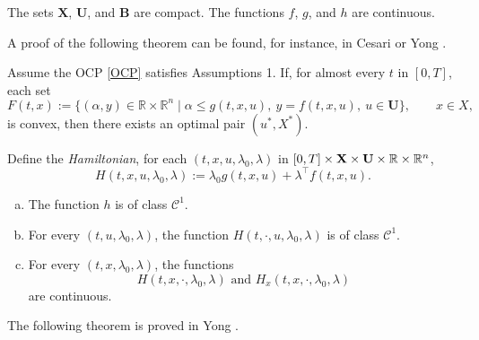 \begin{assumption}\label{FilippovAssump}\rm The sets $\mathbf{X}$,  $\mathbf{U}$, and $\mathbf{B}$ are compact. The functions $f$, $g$, and $h$ are continuous.
\end{assumption}
A proof of the following theorem can be found, for instance, in Cesari \cite[Sect. 9.3.]{Cesari83} or Yong \cite[Theorem 2.2.1]{Yong2015}. 
\begin{theorem}[Filippov]\label{FilipovThm} Assume the OCP \eqref{OCP} satisfies Assumptions 1. If, for almost every $t$ in $[0,T]$, each set
        \begin{equation}\label{convexF(t,x)}
F(t,x):= \{ (\alpha, y)\in \mathbb{R}\times \mathbb{R}^n\mid  
    \alpha \leq g(t,x,u), \  y=f(t,x,u), \ u\in \mathbf{U}\},\qquad x\in X,
        \end{equation}
is convex, then there exists an optimal pair $(u^\ast,X^\ast)$.
\end{theorem} 

Define the {\it Hamiltonian}, for each  $(t,x,u,\lambda_0,\lambda)$ in 
$[0,T]\times \mathbf{X}\times \mathbf{U}\times\mathbb{R}\times\mathbb{R}^n$,
    \[H(t,x,u,\lambda_0,\lambda):= \lambda_0g(t,x,u) + \lambda^\top f(t,x,u).  
    \]  
    

\begin{assumption}\label{MPassump}\rm  
\begin{enumerate}[(a)]
    \item The function $h$ is of class $\mathcal{C}^1$.
    \item For every $(t,u,\lambda_0,\lambda)$, the function $H(t,\cdot,u,\lambda_0,\lambda)$ is of class $\mathcal{C}^1$.
    \item For every $(t,x,\lambda_0,\lambda)$, the functions
     \[ H(t,x,\cdot,\lambda_0,\lambda) \mbox{ and }   H_x(t,x,\cdot,\lambda_0,\lambda)  \]
are continuous.
\end{enumerate}
\end{assumption}


The following theorem is proved in Yong \cite[Theorem 2.3.1]{Yong2015}.

